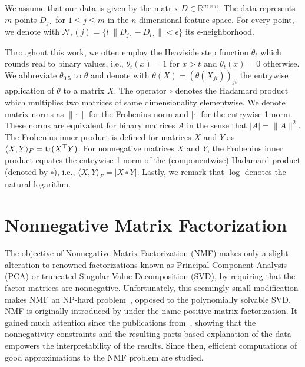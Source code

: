 We assume that our data is given by the matrix $D\in\mathbb{R}^{m\times n}$. The data represents $m$ points $D_{j\cdot}$ for $1\leq j\leq m$ in the $n$-dimensional feature space. For every point, we denote with $\mathcal{N}_\epsilon(j)=\{l\rvert  \lVert D_{j\cdot}-D_{l\cdot}\rVert <\epsilon\}$ its $\epsilon$-neighborhood.

Throughout this work, we often employ the Heaviside step function $\theta_t$ which rounds real to binary values, i.e., $\theta_t(x)=1$ for $x> t$  and $\theta_t(x)=0$ otherwise. We abbreviate $\theta_{0.5}$ to $\theta$ and denote with $\theta(X)=(\theta(X_{ji}))_{ji}$ the entrywise application of $\theta$ to a matrix $X$.
The operator $\circ$ denotes the Hadamard product which multiplies two matrices of same dimensionality elementwise. 
We denote matrix norms as $\lVert \cdot\rVert $ for the Frobenius norm and $\lvert \cdot\rvert $ for the entrywise 1-norm. These norms are equivalent for binary matrices $A$ in the sense that $\lvert A\rvert =\lVert A\rVert ^2$. The Frobenius inner product is defined for matrices $X$ and $Y$ as $\langle X,Y\rangle_F=\operatorname*{tr}(X^\top Y)$. For nonnegative matrices $X$ and $Y$, the Frobenius inner product equates the entrywise 1-norm of the (componentwise) Hadamard product (denoted by $\circ$), i.e., $\langle X,Y\rangle_F=\lvert X\circ Y\rvert $. 
Lastly, we remark that $\log$ denotes the natural logarithm. 
\section{Nonnegative Matrix Factorization}
The objective of Nonnegative Matrix Factorization (NMF) makes only a slight alteration to renowned factorizations known as Principal Component Analysis (PCA) or truncated Singular Value Decomposition (SVD), by requiring that the factor matrices are nonnegative. Unfortunately, this seemingly small modification makes NMF an NP-hard problem~\citep{vavasis2009complexity}, opposed to the polynomially solvable SVD. NMF is originally introduced by \cite{paatero1994positive} under the name positive matrix factorization. It gained much attention since the publications from~\citeauthor{lee1999learning}, showing that the nonnegativity constraints and the resulting parts-based explanation of the data empowers the interpretability of the results. Since then, efficient computations of good approximations to the NMF problem are studied.            

